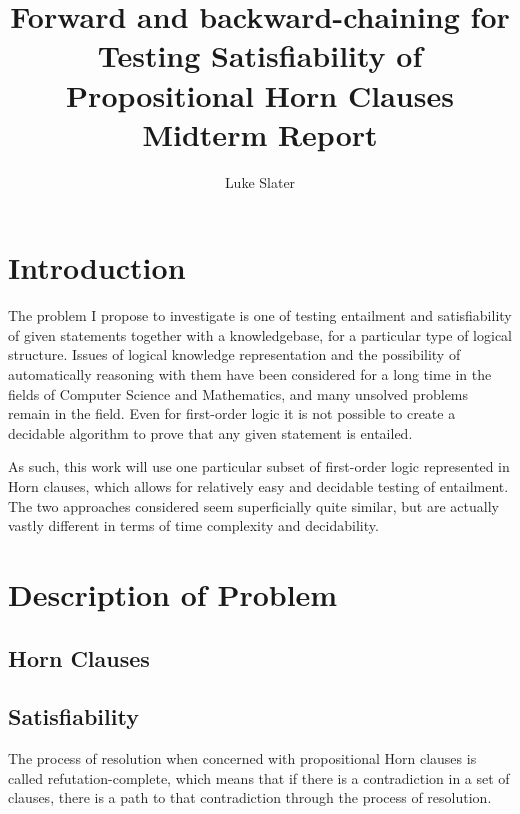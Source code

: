 \documentclass{article}
\begin{document}
\title{Forward and backward-chaining for Testing Satisfiability of Propositional Horn Clauses \protect\\ Midterm Report}
\author{Luke Slater}

\maketitle

\section{Introduction}

The problem I propose to investigate is one of testing entailment and
satisfiability of given statements together with a knowledgebase, for a particular 
type of logical structure. Issues of 
logical knowledge representation and the possibility of automatically reasoning
with them have been considered for a long time in the fields of Computer Science
and Mathematics, and many unsolved problems
remain in the field. Even for first-order logic it is not possible to create a
decidable algorithm to prove that any given statement is entailed.

As such, this work will use one particular subset of first-order logic
represented in Horn clauses, which allows for relatively easy and
decidable testing of entailment. The two approaches considered seem
superficially quite similar, but are actually vastly different in terms of
time complexity and decidability.

\section{Description of Problem}

\subsection{Horn Clauses}

\subsection{Satisfiability}

The process of resolution when concerned with propositional Horn clauses is
called refutation-complete\cite{refcomp}, which means that if there is a
contradiction in a set of clauses, there is a path to that contradiction through
the process of resolution.\cite{resolution}
\end{document}
